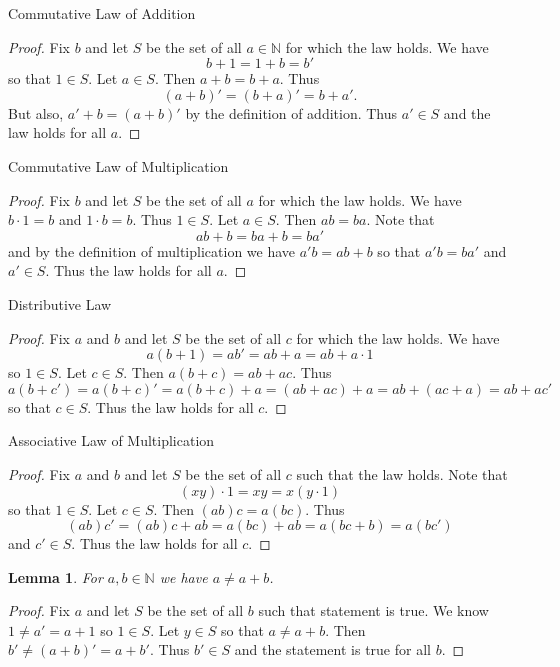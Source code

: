 \documentclass{article}
\newtheorem{lemma}{Lemma}
\begin{document}
\begin{flushleft}
Commutative Law of Addition
\begin{proof}
Fix $b$ and let $S$ be the set of all $a \in \mathbb{N}$ for which the law holds. We have
\[
b + 1 = 1 + b = b'
\]
so that $1 \in S$. Let $a \in S$. Then $a + b = b + a$. Thus
\[
(a + b)' = (b + a)' = b + a'.
\]
But also, $a' + b = (a + b)'$ by the definition of addition. Thus $a' \in S$ and the law holds for all $a$.
\end{proof}

Commutative Law of Multiplication
\begin{proof}
Fix $b$ and let $S$ be the set of all $a$ for which the law holds. We have $b \cdot 1 = b$ and $1 \cdot b = b$. Thus $1 \in S$. Let $a \in S$. Then $ab = ba$. Note that
\[
ab + b = ba + b = ba'
\]
and by the definition of multiplication we have $a'b = ab + b$ so that $a'b = ba'$ and $a' \in S$. Thus the law holds for all $a$.
\end{proof}

Distributive Law
\begin{proof}
Fix $a$ and $b$ and let $S$ be the set of all $c$ for which the law holds. We have
\[
a(b+1) = ab' = ab + a = ab + a \cdot 1
\]
so $1 \in S$. Let $c \in S$. Then $a(b+c) = ab + ac$. Thus
\[
a(b+c') = a(b+c)' = a(b+c) + a = (ab + ac) + a = ab + (ac + a) = ab + ac'
\]
so that $c \in S$. Thus the law holds for all $c$.
\end{proof}

Associative Law of Multiplication
\begin{proof}
Fix $a$ and $b$ and let $S$ be the set of all $c$ such that the law holds. Note that
\[(xy) \cdot 1 = xy = x(y \cdot 1)
\]
so that $1 \in S$. Let $c \in S$. Then $(ab)c = a(bc)$. Thus
\[
(ab)c' = (ab)c + ab = a(bc) + ab = a(bc + b) = a(bc')
\]
and $c' \in S$. Thus the law holds for all $c$.
\end{proof}

\begin{lemma}
For $a,b \in \mathbb{N}$ we have $a \neq a + b$.
\end{lemma}
\begin{proof}
Fix $a$ and let $S$ be the set of all $b$ such that statement is true. We know $1 \neq a' = a+1$ so $1 \in S$. Let $y \in S$ so that $a \neq a + b$. Then $b' \neq (a+b)' = a + b'$. Thus $b' \in S$ and the statement is true for all $b$.
\end{proof}


\end{flushleft}
\end{document}
